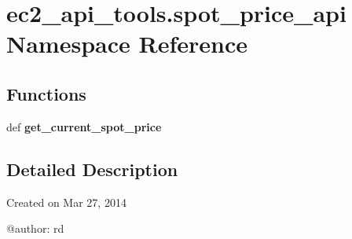 \hypertarget{namespaceec2__api__tools_1_1spot__price__api}{\section{ec2\-\_\-api\-\_\-tools.\-spot\-\_\-price\-\_\-api Namespace Reference}
\label{namespaceec2__api__tools_1_1spot__price__api}
}
\subsection*{Functions}
\begin{DoxyCompactItemize}
\item 
\hypertarget{namespaceec2__api__tools_1_1spot__price__api_ac9d6cd69bbbbac77373068c0cb3af60f}{def {\bfseries get\-\_\-current\-\_\-spot\-\_\-price}}\label{namespaceec2__api__tools_1_1spot__price__api_ac9d6cd69bbbbac77373068c0cb3af60f}

\end{DoxyCompactItemize}


\subsection{Detailed Description}
\begin{DoxyVerb}Created on Mar 27, 2014

@author: rd
\end{DoxyVerb}
 